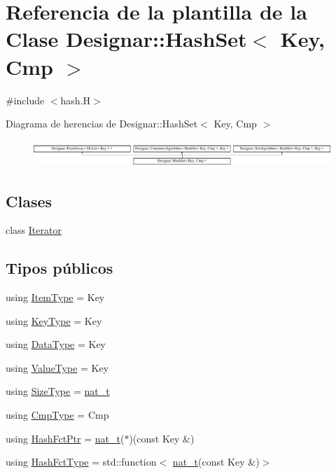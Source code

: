 \hypertarget{class_designar_1_1_hash_set}{}\section{Referencia de la plantilla de la Clase Designar\+:\+:Hash\+Set$<$ Key, Cmp $>$}
\label{class_designar_1_1_hash_set}


{\ttfamily \#include $<$hash.\+H$>$}

Diagrama de herencias de Designar\+:\+:Hash\+Set$<$ Key, Cmp $>$\begin{figure}[H]
\begin{center}
\leavevmode
\includegraphics[height=1.000894cm]{class_designar_1_1_hash_set}
\end{center}
\end{figure}
\subsection*{Clases}
\begin{DoxyCompactItemize}
\item 
class \hyperlink{class_designar_1_1_hash_set_1_1_iterator}{Iterator}
\end{DoxyCompactItemize}
\subsection*{Tipos públicos}
\begin{DoxyCompactItemize}
\item 
using \hyperlink{class_designar_1_1_hash_set_af1cb023a84bf6c6f17867f99bbc523c5}{Item\+Type} = Key
\item 
using \hyperlink{class_designar_1_1_hash_set_a4e23320d0b13915ce84186132ad4197a}{Key\+Type} = Key
\item 
using \hyperlink{class_designar_1_1_hash_set_af75f5917c5f53891a4129bd77d5d2906}{Data\+Type} = Key
\item 
using \hyperlink{class_designar_1_1_hash_set_a4edc6d161470bffb03dad2bbc916b6a0}{Value\+Type} = Key
\item 
using \hyperlink{class_designar_1_1_hash_set_a1bfcb16c2a94c0ab22e15f38b05ba8cc}{Size\+Type} = \hyperlink{namespace_designar_aa72662848b9f4815e7bf31a7cf3e33d1}{nat\+\_\+t}
\item 
using \hyperlink{class_designar_1_1_hash_set_ad0ab040392888a3320d2d72d1ead9968}{Cmp\+Type} = Cmp
\item 
using \hyperlink{class_designar_1_1_hash_set_a7a8b0a4970519ebc9ccc1ad247d0639f}{Hash\+Fct\+Ptr} = \hyperlink{namespace_designar_aa72662848b9f4815e7bf31a7cf3e33d1}{nat\+\_\+t}($\ast$)(const Key \&)
\item 
using \hyperlink{class_designar_1_1_hash_set_a05d8d111665c25bc17290c01fa299398}{Hash\+Fct\+Type} = std\+::function$<$ \hyperlink{namespace_designar_aa72662848b9f4815e7bf31a7cf3e33d1}{nat\+\_\+t}(const Key \&)$>$
\end{DoxyCompactItemize}
